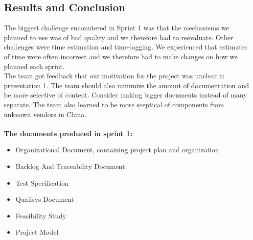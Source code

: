 \subsection{Results and Conclusion}

The biggest challenge encountered in Sprint 1 was that the mechanisms we planned to use was of bad quality and we therefore had to reevaluate. Other challenges were time estimation and time-logging. We experienced that estimates of time were often incorrect and we therefore had to make changes on how we planned each sprint.\\

The team got feedback that our motivation for the project was unclear in presentation 1. The team should also minimize the amount of documentation and be more selective of content. Consider making bigger documents instead of many separate. The team also learned to be more sceptical of components from unknown vendors in China.\\
\\
\textbf{The documents produced in sprint 1:}
\begin{itemize}
    \item Organizational Document, containing project
 plan and organization
    \item Backlog And Traceability Document
    \item Test Specification
    \item Qualisys Document
    \item Feasibility Study
    \item Project Model
\end{itemize}
\\\\




